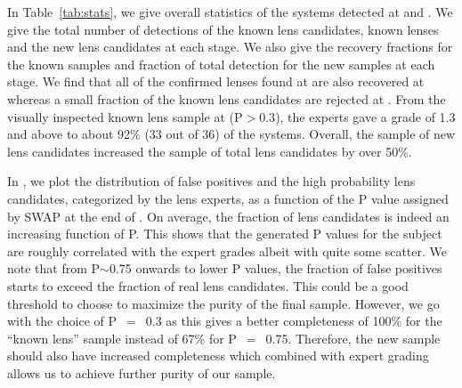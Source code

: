 \documentclass[useAMS,usenatbib,a4paper]{mn2e}
\begin{document}
In Table~\ref{tab:stats}, we give overall statistics of the systems
detected at \StageOne and \StageTwo. We give the total number of
detections of the known lens candidates, known lenses and the new lens
candidates at each stage.  We also give the recovery fractions for the
known samples and fraction of total detection for the new samples at
each stage. We find that all of the confirmed lenses found
at \StageOne are also recovered at \StageTwo whereas a small fraction of
the known lens candidates are rejected at \StageTwo. From the visually
inspected known lens sample at \StageTwo (P$> 0.3$), the experts gave a
grade of 1.3 and above to about 92\% (33 out of 36) of the systems. Overall,
the sample of new \sw lens candidates increased the sample of total
\cfhtls lens candidates by over 50\%.

In , we plot the distribution of false positives and
the high probability lens candidates, categorized by the lens experts,
as a function of the P value assigned by SWAP at the end of \StageTwo.
On average, the fraction of lens candidates is indeed an increasing
function of P. This shows that the \sw generated P values for the
subject are roughly correlated with the expert grades albeit with quite
some scatter.  We note that from P$\sim$0.75 onwards to lower P values,
the fraction of false positives starts to exceed the fraction of real
lens candidates. This could be a good threshold to choose to maximize
the purity of the final sample. However, we go with the choice of
P~$=$~0.3 as this gives a better completeness of 100\% for the ``known
lens'' sample instead of 67\% for P~$=$~0.75. Therefore, the new sample
should also have increased completeness which combined with expert
grading allows us to achieve further purity of our sample.
\end{document}
